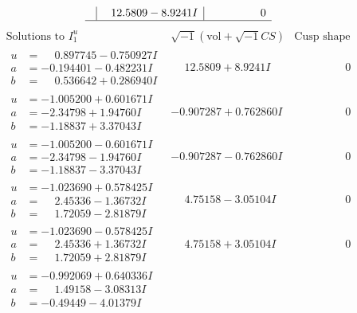 \documentclass[1p]{elsarticle_modified}
\theoremstyle{definition}
\newcommand{\I}{\sqrt{-1}}
\begin{document}
$$\begin{array}{c|c|c}
 & \phantom{-}12.5809 - 8.9241 I & \phantom{-0.000000 } 0\\
 \hline 
 \end{array}$$\newpage$$\begin{array}{c|c|c}  
\text{Solutions to }I^u_{1}& \I (\text{vol} + \sqrt{-1}CS) & \text{Cusp shape}\\
 \hline 
\begin{aligned}
u &= \phantom{-}0.897745 - 0.750927 I \\
a &= -0.194401 - 0.482231 I \\
b &= \phantom{-}0.536642 + 0.286940 I\end{aligned}
 & \phantom{-}12.5809 + 8.9241 I & \phantom{-0.000000 } 0 \\ \hline\begin{aligned}
u &= -1.005200 + 0.601671 I \\
a &= -2.34798 + 1.94760 I \\
b &= -1.18837 + 3.37043 I\end{aligned}
 & -0.907287 + 0.762860 I & \phantom{-0.000000 } 0 \\ \hline\begin{aligned}
u &= -1.005200 - 0.601671 I \\
a &= -2.34798 - 1.94760 I \\
b &= -1.18837 - 3.37043 I\end{aligned}
 & -0.907287 - 0.762860 I & \phantom{-0.000000 } 0 \\ \hline\begin{aligned}
u &= -1.023690 + 0.578425 I \\
a &= \phantom{-}2.45336 - 1.36732 I \\
b &= \phantom{-}1.72059 - 2.81879 I\end{aligned}
 & \phantom{-}4.75158 - 3.05104 I & \phantom{-0.000000 } 0 \\ \hline\begin{aligned}
u &= -1.023690 - 0.578425 I \\
a &= \phantom{-}2.45336 + 1.36732 I \\
b &= \phantom{-}1.72059 + 2.81879 I\end{aligned}
 & \phantom{-}4.75158 + 3.05104 I & \phantom{-0.000000 } 0 \\ \hline\begin{aligned}
u &= -0.992069 + 0.640336 I \\
a &= \phantom{-}1.49158 - 3.08313 I \\
b &= -0.49449 - 4.01379 I\end{aligned}

\end{array}$$
\end{document}
